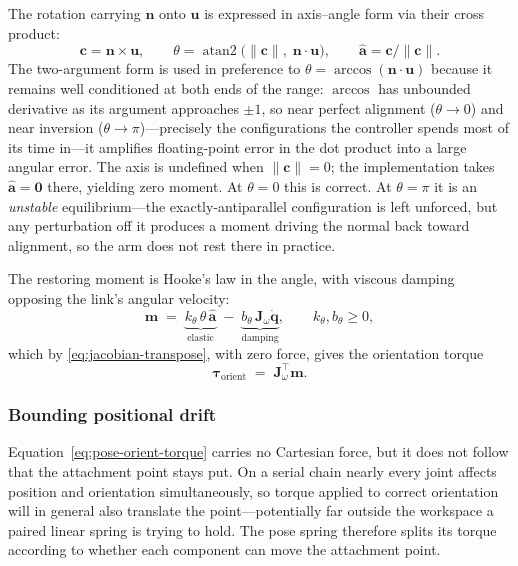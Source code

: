 The rotation carrying $\bm{n}$ onto $\bm{u}$ is expressed in axis--angle form
via their cross product:
%
\begin{equation}
  \bm{c} = \bm{n} \times \bm{u},
  \qquad
  \theta = \operatorname{atan2}\bigl(\lVert\bm{c}\rVert,\;
                                     \bm{n}\cdot\bm{u}\bigr),
  \qquad
  \hat{\bm{a}} = \bm{c}/\lVert\bm{c}\rVert.
  \label{eq:pose-axis-angle}
\end{equation}
%
The two-argument form is used in preference to
$\theta = \arccos(\bm{n}\cdot\bm{u})$ because it remains well conditioned at
both ends of the range: $\arccos$ has unbounded derivative as its argument
approaches $\pm 1$, so near perfect alignment ($\theta \to 0$) and near
inversion ($\theta \to \pi$)---precisely the configurations the controller
spends most of its time in---it amplifies floating-point error in the dot
product into a large angular error. The axis is undefined when
$\lVert\bm{c}\rVert = 0$; the implementation takes $\hat{\bm{a}} = \bm{0}$
there, yielding zero moment. At $\theta = 0$ this is correct. At $\theta = \pi$
it is an \emph{unstable} equilibrium---the exactly-antiparallel configuration
is left unforced, but any perturbation off it produces a moment driving the
normal back toward alignment, so the arm does not rest there in practice.

The restoring moment is Hooke's law in the angle, with viscous damping opposing
the link's angular velocity:
%
\begin{equation}
  \bm{m} \;=\; \underbrace{k_{\theta}\,\theta\,\hat{\bm{a}}}_{\text{elastic}}
  \;-\; \underbrace{b_{\theta}\,\bm{J}_{\omega}\dot{\bm{q}}}_{\text{damping}},
  \qquad k_{\theta}, b_{\theta} \ge 0,
  \label{eq:pose-moment}
\end{equation}
%
which by \eqref{eq:jacobian-transpose}, with zero force, gives the
orientation torque
%
\begin{equation}
  \bm{\tau}_{\mathrm{orient}} \;=\; \bm{J}_{\omega}^{\top}\bm{m}.
  \label{eq:pose-orient-torque}
\end{equation}

\subsubsection{Bounding positional drift}
\label{sec:pose-nullspace}

Equation~\eqref{eq:pose-orient-torque} carries no Cartesian force, but it does
not follow that the attachment point stays put. On a serial chain nearly every
joint affects position and orientation simultaneously, so torque applied to
correct orientation will in general also translate the point---potentially far
outside the workspace a paired linear spring is trying to hold. The pose spring
therefore splits its torque according to whether each component can move the
attachment point.

